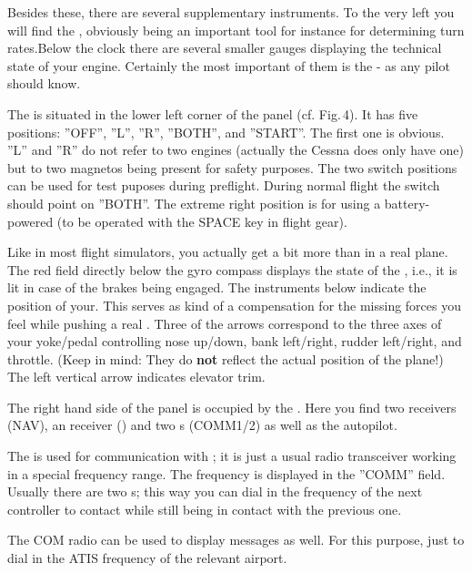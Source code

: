 Besides these, there are several supplementary instruments. To the very left you will find the
, obviously being an important tool for instance for determining turn rates.Below the clock there are several smaller gauges displaying the technical state of your engine. Certainly the most important of them is the  - as any pilot should know.

The  is situated in the lower left corner of the panel (cf. Fig.\,4). It has five positions: ''OFF'', ''L'', ''R'', ''BOTH'', and ''START''. The first one is obvious. ''L'' and ''R'' do not refer to two engines (actually the Cessna does only have one) but to two magnetos being present for safety purposes. The two switch positions can be used for test puposes during preflight. During normal flight the switch should point on ''BOTH''. The extreme right position is for  using a battery-powered  (to be operated with the SPACE key in flight gear). 

Like in most flight simulators, you actually get a bit more than in a real plane. The red field directly below the gyro compass displays the state of the , i.e., it is lit in case of the brakes being engaged. The instruments below indicate the position of your. This serves as kind of a compensation for the missing forces you feel while pushing a real . Three of the arrows correspond to the three axes of your yoke/pedal controlling nose up/down, bank left/right, rudder left/right, and throttle. (Keep in mind: They do \textbf{not} reflect the actual position of the plane!) The left vertical arrow indicates elevator trim. 

The right hand side of the panel is occupied by the . Here you find
two  receivers (NAV), an  receiver
() and two s (COMM1/2) as
well as the autopilot.

The  is used for communication with ; it is just a usual radio transceiver working in a special frequency range.
The frequency is displayed in the ''COMM'' field. Usually there are two s; this way you can dial in the frequency of the next controller to contact
while still being in contact with the previous one.

The COM radio can be used to display  messages as well. For this purpose, just to dial in the ATIS frequency of the relevant airport.

